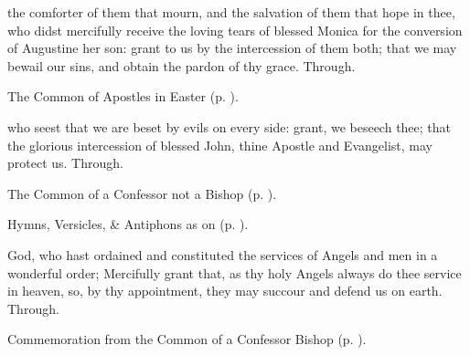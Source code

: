 \memorialCollect
{} the comforter of them that mourn, and the salvation of them that hope in thee, who didst mercifully receive the loving tears of blessed Monica for the conversion of Augustine her son: grant to us by the intercession of them both; that we may bewail our sins, and obtain the pardon of thy grace. Through.



\begin{rubric}
	The Common of Apostles in Easter (p. \pageref{CommonApostlesEaster}).
\end{rubric}



\collect
{} who seest that we are beset by evils on every side: grant, we beseech thee; that the glorious intercession of blessed John, thine Apostle and Evangelist, may protect us. Through.



\begin{rubric}
	The Common of a Confessor not a Bishop (p. \pageref{ConfessorNotBishopCollect}).
\end{rubric}



\begin{rubric}
	Hymns, Versicles, \& Antiphons as on  (p. \pageref{Michaelmas}).
\end{rubric}

{} God, who hast ordained and constituted the services of Angels and men in a wonderful order; Mercifully grant that, as thy holy Angels always do thee service in heaven, so, by thy appointment, they may succour and defend us on earth. Through.
\begin{rubric}
	Commemoration  from the Common of a Confessor Bishop (p. \pageref{ConfessorBishopCollect}).
\end{rubric}

